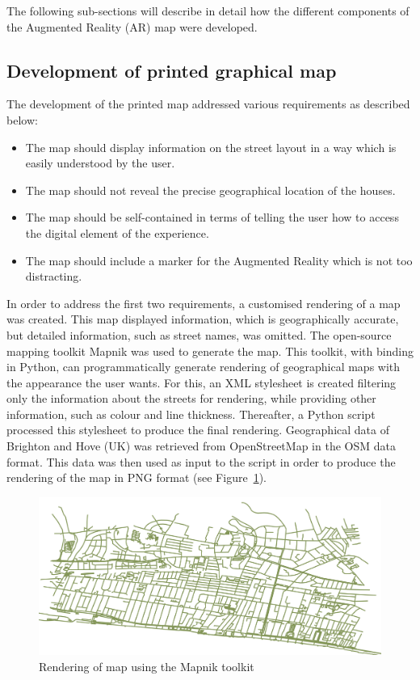 \documentclass[acmlarge,screen,dvipsnames]{acmart}
\begin{document}
The following sub-sections will describe in detail how the different
components of the Augmented Reality (AR) map were developed.

\subsection{Development of printed graphical map} %
The development of the printed map addressed various requirements as described
below:

\begin{itemize} 
  \item The map should display information on the street layout in a way which is easily understood by the user. 
  \item The map should not reveal the precise geographical location of the houses. 
  \item The map should be self-contained in terms of telling the user how to access 
  the digital element of the experience. 
  \item The map should include a marker for the Augmented Reality which is not too distracting. 
\end{itemize}

In order to address the first two requirements, a customised rendering of a
map was created. This map displayed information, which is geographically
accurate, but detailed information, such as street names, was omitted. The
open-source mapping toolkit Mapnik \cite{mapnik} was used to generate the map.
This toolkit, with binding in Python, can programmatically generate rendering
of geographical maps with the appearance the user wants. For this, an XML
stylesheet is created filtering only the information about the streets for
rendering, while providing other information, such as colour and line thickness.
Thereafter, a Python script processed this stylesheet to produce the final
rendering. Geographical data of Brighton and Hove (UK) was retrieved from OpenStreetMap
\cite{OpenStreetMap} in the OSM data format. This data was then used as input
to the script in order to produce the rendering of the map in PNG format (see
Figure~\ref{fig:map}).


\begin{figure}[b]
\includegraphics[width=\linewidth]{images/maprender.jpg}
\caption{Rendering of map using the Mapnik toolkit} \label{fig:map} 
\end{figure}
 
\end{document}
